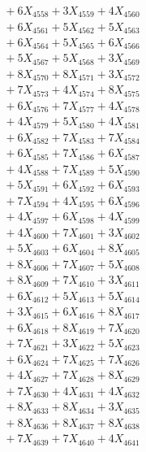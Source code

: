 \documentclass[a4paper,10pt]{article}
\begin{document}
{\begin{align}
&\;  + 6 X_{4558} + 3 X_{4559} + 4 X_{4560} \\[0.3ex]
&\;  + 6 X_{4561} + 5 X_{4562} + 5 X_{4563} \\[0.3ex]
&\;  + 6 X_{4564} + 5 X_{4565} + 6 X_{4566} \\[0.3ex]
&\;  + 5 X_{4567} + 5 X_{4568} + 3 X_{4569} \\[0.5ex]\allowbreak
&\;  + 8 X_{4570} + 8 X_{4571} + 3 X_{4572} \\[0.3ex]
&\;  + 7 X_{4573} + 4 X_{4574} + 8 X_{4575} \\[0.3ex]
&\;  + 6 X_{4576} + 7 X_{4577} + 4 X_{4578} \\[0.3ex]
&\;  + 4 X_{4579} + 5 X_{4580} + 4 X_{4581} \\[0.3ex]
&\;  + 6 X_{4582} + 7 X_{4583} + 7 X_{4584} \\[0.3ex]
&\;  + 6 X_{4585} + 7 X_{4586} + 6 X_{4587} \\[0.3ex]
&\;  + 4 X_{4588} + 7 X_{4589} + 5 X_{4590} \\[0.3ex]
&\;  + 5 X_{4591} + 6 X_{4592} + 6 X_{4593} \\[0.3ex]
&\;  + 7 X_{4594} + 4 X_{4595} + 6 X_{4596} \\[0.3ex]
&\;  + 4 X_{4597} + 6 X_{4598} + 4 X_{4599} \\[0.5ex]\allowbreak
&\;  + 4 X_{4600} + 7 X_{4601} + 3 X_{4602} \\[0.3ex]
&\;  + 5 X_{4603} + 6 X_{4604} + 8 X_{4605} \\[0.3ex]
&\;  + 8 X_{4606} + 7 X_{4607} + 5 X_{4608} \\[0.3ex]
&\;  + 8 X_{4609} + 7 X_{4610} + 3 X_{4611} \\[0.3ex]
&\;  + 6 X_{4612} + 5 X_{4613} + 5 X_{4614} \\[0.3ex]
&\;  + 3 X_{4615} + 6 X_{4616} + 8 X_{4617} \\[0.3ex]
&\;  + 6 X_{4618} + 8 X_{4619} + 7 X_{4620} \\[0.3ex]
&\;  + 7 X_{4621} + 3 X_{4622} + 5 X_{4623} \\[0.3ex]
&\;  + 6 X_{4624} + 7 X_{4625} + 7 X_{4626} \\[0.3ex]
&\;  + 4 X_{4627} + 7 X_{4628} + 8 X_{4629} \\[0.5ex]\allowbreak
&\;  + 7 X_{4630} + 4 X_{4631} + 4 X_{4632} \\[0.3ex]
&\;  + 8 X_{4633} + 8 X_{4634} + 3 X_{4635} \\[0.3ex]
&\;  + 8 X_{4636} + 8 X_{4637} + 8 X_{4638} \\[0.3ex]
&\;  + 7 X_{4639} + 7 X_{4640} + 4 X_{4641} \\[0.3ex]

\end{align}}
\end{document}

